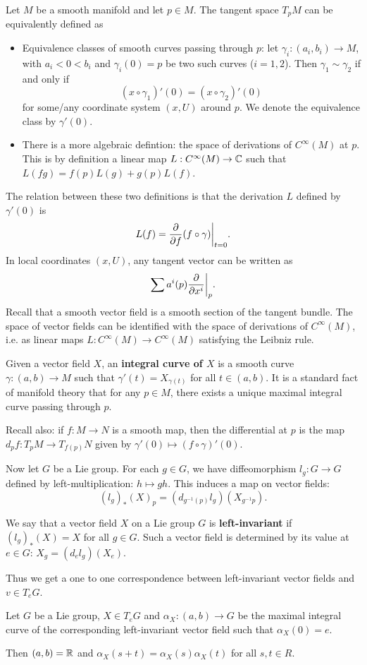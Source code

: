 \documentclass[11pt, english]{article}
\begin{document}
Let $M$ be a smooth manifold and let $p \in M$. The tangent space $T_pM$ can be equivalently defined as
\begin{itemize}
\item Equivalence classes of smooth curves passing through $p$: let $\gamma_i:(a_i,b_i) \to M$, with $a_i < 0 < b_i$ and $\gamma_i(0)=p$ be two such curves ($i=1,2$). Then $\gamma_1 \sim \gamma_2$ if and only if 
$$
(x \circ \gamma_1)'(0) = (x \circ \gamma_2)'(0)
$$
for some/any coordinate system $(x,U)$ around $p$. We denote the equivalence class by $\gamma'(0)$.
\item There is a more algebraic defintion: the space of derivations of $C^\infty (M)$ at $p$. This is by definition a linear map $L:C^\infty(M) \to \mathbb{C}$ such that $L(fg) = f(p)L(g) + g(p)L(f)$.
\end{itemize}
The relation between these two definitions is that the derivation $L$ defined by $\gamma'(0)$ is
$$
L(f) = \restr{\dd{}{f}(f \circ \gamma)}{t=0}.
$$
In local coordinates $(x,U)$, any tangent vector can be written as
$$
\sum a^i(p) \restr{\dd{}{x^i}}{p}.
$$
Recall that a smooth vector field is a smooth section of the tangent bundle. The space of vector fields can be identified with the space of derivations of $C^\infty(M)$, i.e. as linear maps $L:C^\infty(M) \to C^\infty(M)$ satisfying the Leibniz rule.

Given a vector field $X$, an \textbf{integral curve of $X$} is a smooth curve $\gamma:(a,b) \to M$ such that $\gamma'(t) = X_{\gamma(t)}$ for all $t \in (a,b)$. It is a standard fact of manifold theory that for any $p \in M$, there exists a unique maximal integral curve passing through $p$. 

Recall also: if $f:M \to N$ is a smooth map, then the differential at $p$ is the map  $d_pf:T_pM \to T_{f(p)}N$ given by $\gamma'(0) \mapsto (f \circ \gamma)'(0)$. 

Now let $G$ be a Lie group. For each $g \in G$, we have diffeomorphism $l_g:G \to G$ defined by left-multiplication: $h \mapsto gh$. This induces a map on vector fields:
$$
(l_g)_\ast(X)_p = (d_{g^{-1}(p)} l_g)(X_{g^{-1}p}).
$$

We say that a vector field $X$ on a Lie group $G$ is \textbf{left-invariant} if $(l_g)_\ast(X)=X$ for all $g \in G$. Such a vector field is determined by its value at $e \in G$: $X_g = (d_e l_g)(X_e)$.

Thus we get a one to one correspondence between left-invariant vector fields and $v \in T_eG$.
 
\begin{prop}
 Let $G$ be a Lie group, $X \in T_eG$ and $\alpha_X:(a,b) \to G$ be the maximal integral curve of the corresponding left-invariant vector field such that $\alpha_X(0)=e$.

Then $(a,b)=\mathbb{R}$ and $\alpha_X(s+t) = \alpha_X(s)\alpha_X(t)$ for all $s,t \in R$.
\end{prop}
\end{document}
